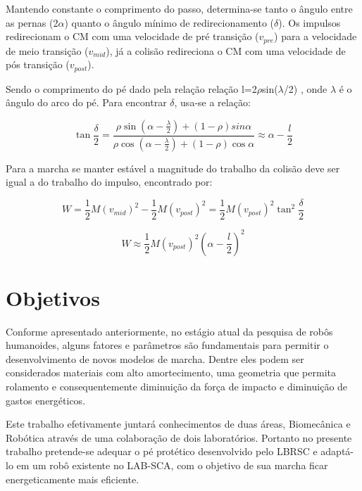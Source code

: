Mantendo constante o comprimento do  passo, determina-se tanto o ângulo entre as pernas (2$\alpha$) quanto o ângulo mínimo  de redirecionamento ($\delta$). Os impulsos redirecionam o CM com uma  velocidade de pré transição ($ v_{pre}$) para a velocidade de meio transição ($v_{mid}$), já a colisão redireciona o CM com uma velocidade de pós transição ($v_{post}$). 

Sendo o comprimento do pé dado pela relação relação l=2$\rho$sin($\lambda$/2) , onde $\lambda$ é o ângulo do arco do pé. Para encontrar  $\delta$, usa-se a relação:

\begin{equation}
\tan\frac{\delta }{2}=\frac{\rho\sin (\alpha-\frac{\lambda}{2})+(1-\rho)sin\alpha}{\rho\cos (\alpha-\frac{\lambda}{2})+(1-\rho)\cos\alpha }\approx\alpha-\frac{l}{2}
\end{equation}

Para a marcha se manter estável a magnitude do trabalho da colisão deve ser igual a do trabalho do impulso, encontrado por:

\begin{equation}
W=\frac{1}{2}M(v_{mid})^2-\frac{1}{2}M(v_{post})^2=\frac{1}{2}M(v_{post})^2\tan^2\frac{\delta}{2}
\end{equation}


\begin{equation}
W\approx\frac{1}{2}M(v_{post})^2(\alpha-\frac{l}{2})^2
\end{equation}





\newpage

\section{Objetivos}

Conforme apresentado anteriormente, no estágio atual da pesquisa de robôs humanoides, alguns fatores e parâmetros são fundamentais para permitir o desenvolvimento de novos modelos de marcha. Dentre eles podem ser considerados materiais com alto amortecimento, uma geometria que permita rolamento e consequentemente diminuição da força de impacto e diminuição de gastos energéticos.

Este  trabalho efetivamente juntará conhecimentos de duas áreas, Biomecânica e Robótica através de uma colaboração de dois laboratórios. Portanto no presente trabalho pretende-se adequar o pé protético desenvolvido pelo LBRSC e adaptá-lo em um robô existente no LAB-SCA, com o objetivo de sua marcha ficar energeticamente mais eficiente. 

